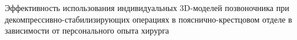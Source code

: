 
Эффективность использования индивидуальных 3D-моделей позвоночника
при декомпрессивно-стабилизирующих операциях в пояснично-крестцовом
отделе в зависимости от персонального опыта хирурга
